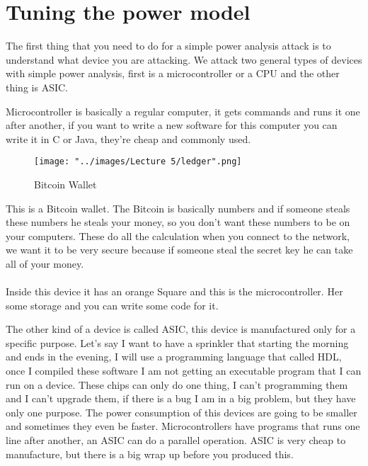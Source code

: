 \documentclass{report}
\begin{document}
\section{Tuning the power model}

 The first thing that you need to do for a simple power analysis attack is to understand what device you are attacking. We attack two general types of devices with simple power analysis, first is a microcontroller or a CPU and the other thing is ASIC. 
 
Microcontroller is basically a regular computer, it gets commands and runs it one after another, if you want to write a new software for this computer you can write it in C or Java, they're cheap and commonly used.

\begin{figure}[htp]
\hspace*{-0.5in}
\texttt{[image: "../images/Lecture 5/ledger".png]}
\caption{Bitcoin Wallet}
\label{}
\end{figure}

This is a Bitcoin wallet. The Bitcoin is basically numbers and if someone steals these numbers he steals your money, so you don't want these numbers to be on your computers. These do all the calculation when you connect to the network, we want it to be very secure because if someone steal the secret key he can take all of your money.

\paragraph{}
Inside this device it has an orange Square and this is the microcontroller. Her some storage and you can write some code for it.

The other kind of a device is called ASIC, this device is manufactured only for a specific purpose. Let's say I want to have a sprinkler that starting the morning and ends in the evening, I will use a programming language that called HDL, once I compiled these software I am not getting an executable program that I can run on a device. These chips can only do one thing, I can't programming them and I can't upgrade them, if there is a bug I am in a big problem, but they have only one purpose. The power consumption of this devices are going to be smaller and sometimes they even be faster. Microcontrollers have programs that runs one line after another, an ASIC can do a parallel operation. ASIC is very cheap to manufacture, but there is a big wrap up before you produced this.
\end{document}

